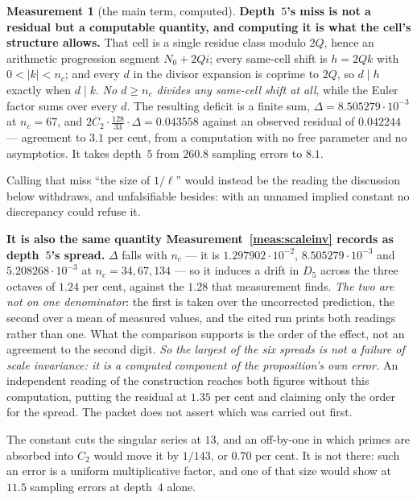 \documentclass[11pt,a4paper]{article}
\theoremstyle{plain}
\theoremstyle{definition}
\newtheorem{measurement}[theorem]{Measurement}
\theoremstyle{remark}
\begin{document}
\begin{measurement}[the main term, computed]
\textbf{Depth~$5$'s miss is not a residual but a computable quantity,
and computing it is what the cell's structure allows.} That cell is a
single residue class modulo $2Q$, hence an arithmetic progression
segment $N_0+2Qi$; every same-cell shift is $h=2Qk$ with $0<|k|<n_c$;
and every $d$ in the divisor expansion is coprime to $2Q$, so $d\mid h$
exactly when $d\mid k$. \emph{No $d\ge n_c$ divides any same-cell shift
at all}, while the Euler factor sums over every $d$. The resulting
deficit is a finite sum, $\Delta=8.505279\cdot10^{-3}$ at $n_c=67$, and
$2C_2\cdot\tfrac{128}{33}\cdot\Delta=0.043558$ against an observed
residual of $0.042244$ --- agreement to $3.1$ per cent, from a
computation with no free parameter and no asymptotics. It takes
depth~$5$ from $260.8$ sampling errors to $8.1$.

Calling that miss ``the size of $1/\ell$'' would instead be the reading
the discussion below withdraws, and unfalsifiable besides: with an
unnamed implied constant no discrepancy could refuse it.

\textbf{It is also the same quantity Measurement~\ref{meas:scaleinv}
records as depth~$5$'s spread.} $\Delta$ falls with $n_c$ --- it is
$1.297902\cdot10^{-2}$, $8.505279\cdot10^{-3}$ and
$5.208268\cdot10^{-3}$ at $n_c=34,67,134$ --- so it induces a drift in
$D_5$ across the three octaves of $1.24$ per cent, against the $1.28$
that measurement finds. \emph{The two are not on one denominator}: the
first is taken over the uncorrected prediction, the second over a mean
of measured values, and the cited run prints both readings rather than
one. What the comparison supports is the order of the effect, not an
agreement to the second digit. \emph{So the largest of the six spreads is not
a failure of scale invariance: it is a computed component of the
proposition's own error.} An independent reading of the construction reaches both
figures without this computation, putting the residual at $1.35$ per
cent and claiming only the order for the spread. The packet does not
assert which was carried out first.

The constant cuts the singular series at $13$, and an off-by-one in
which primes are absorbed into $C_2$ would move it by $1/143$, or
$0.70$ per cent. It is not there: such an error is a uniform
multiplicative factor, and one of that size would show at $11.5$
sampling errors at depth~$4$ alone.


\end{measurement}
\end{document}
